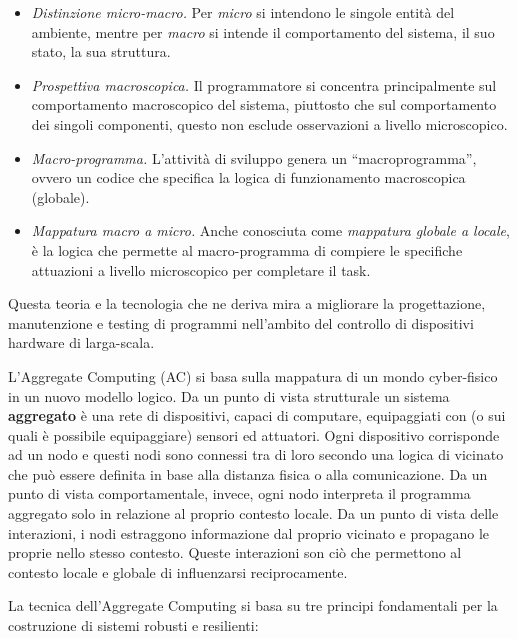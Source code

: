 \documentclass[12pt,a4paper,openright,twoside]{book}
\begin{document}
\begin{itemize}
    \item \textit{Distinzione micro-macro.} Per \textit{micro} si intendono le singole entità del ambiente, mentre per \textit{macro} si intende il comportamento del sistema, il suo stato, la sua struttura.
    \item \textit{Prospettiva macroscopica.} Il programmatore si concentra principalmente sul comportamento macroscopico del sistema, piuttosto che sul comportamento dei singoli componenti, questo non esclude osservazioni a livello microscopico.
    \item \textit{Macro-programma.} L'attività di sviluppo genera un ``macroprogramma'', ovvero un codice che specifica la logica di funzionamento macroscopica (globale).
    \item \textit{Mappatura macro a micro.} Anche conosciuta come \textit{mappatura globale a locale}, è la logica che permette al macro-programma di compiere le specifiche attuazioni a livello microscopico per completare il task.
\end{itemize}

Questa teoria e la tecnologia che ne deriva mira a migliorare la progettazione, manutenzione e testing di programmi nell'ambito del controllo di dispositivi hardware di larga-scala. 

L'Aggregate Computing (AC) si basa sulla mappatura di un mondo cyber-fisico in un nuovo modello logico. Da un punto di vista strutturale un sistema \textbf{aggregato} è una rete di dispositivi, capaci di computare, equipaggiati con (o sui quali è possibile equipaggiare) sensori ed attuatori. Ogni dispositivo corrisponde ad un nodo e questi nodi sono connessi tra di loro secondo una logica di vicinato che può essere definita in base alla distanza fisica o alla comunicazione. Da un punto di vista comportamentale, invece, ogni nodo interpreta il programma aggregato solo in relazione al proprio contesto locale. Da un punto di vista delle interazioni, i nodi estraggono informazione dal proprio vicinato e propagano le proprie nello stesso contesto. Queste interazioni son ciò che permettono al contesto locale e globale di influenzarsi reciprocamente.

La tecnica dell'Aggregate Computing si basa su tre principi fondamentali per la costruzione di sistemi robusti e resilienti:
\end{document}
